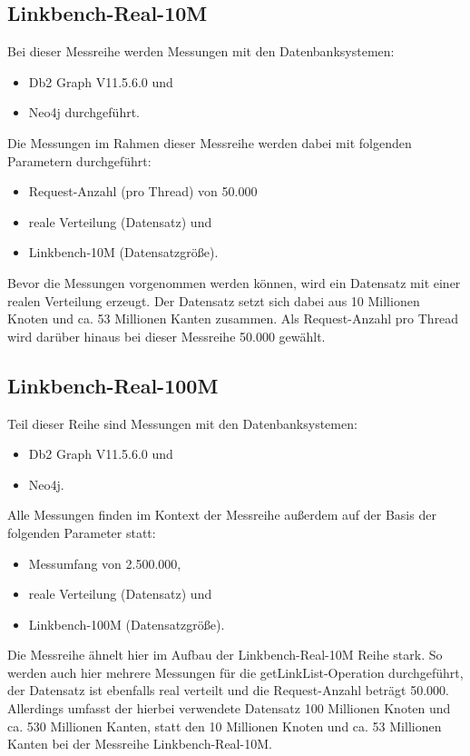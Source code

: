 \subsection{Linkbench-Real-10M}
Bei dieser Messreihe werden Messungen mit den Datenbanksystemen:
\begin{itemize}
    \item Db2 Graph V11.5.6.0 und 
    \item Neo4j durchgeführt. 
\end{itemize}

Die Messungen im Rahmen dieser Messreihe werden dabei mit folgenden Parametern durchgeführt:
\begin{itemize}
    \item Request-Anzahl (pro Thread) von 50.000
    \item reale Verteilung (Datensatz) und 
    \item Linkbench-10M (Datensatzgröße).
\end{itemize}
Bevor die Messungen vorgenommen werden können, wird ein Datensatz mit einer realen Verteilung erzeugt. Der Datensatz setzt sich dabei aus 10 Millionen Knoten und ca. 53 Millionen Kanten zusammen. Als Request-Anzahl pro Thread wird darüber hinaus bei dieser Messreihe 50.000 gewählt. 

\subsection{Linkbench-Real-100M}
Teil dieser Reihe sind Messungen mit den Datenbanksystemen:
\begin{itemize}
    \item Db2 Graph V11.5.6.0 und 
    \item Neo4j. 
\end{itemize}

Alle Messungen finden im Kontext der Messreihe außerdem auf der Basis der folgenden Parameter statt:
\begin{itemize}
    \item Messumfang von 2.500.000,
    \item reale Verteilung (Datensatz) und
    \item Linkbench-100M (Datensatzgröße).
\end{itemize}
Die Messreihe ähnelt hier im Aufbau der Linkbench-Real-10M Reihe stark. So werden auch hier mehrere Messungen für die {getLinkList}-Operation durchgeführt, der Datensatz ist ebenfalls real verteilt und die Request-Anzahl beträgt 50.000. Allerdings umfasst der hierbei verwendete Datensatz 100 Millionen Knoten und ca. 530 Millionen Kanten, statt den 10 Millionen Knoten und ca. 53 Millionen Kanten bei der Messreihe Linkbench-Real-10M.

